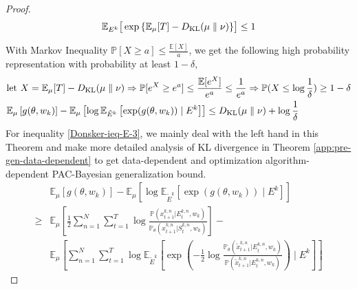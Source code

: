 \begin{proof}
	\begin{equation}
		\label{Donsker-ieq-E-2}
		\mathbb{E}_{E^{k}}\big[\operatorname{exp}{\{\mathbb{E}_{\mu}[T]-D_{\mathrm{KL}}(\mu\parallel \nu)\}}\big] \leq 1
	\end{equation}
	
	With Markov Inequality $\mathbb{P}[X \geq a]\leq \frac{\mathbb{E}[X]}{a}$, we get the following high probability representation with probability at least $1-\delta$,
	\begin{align}
		&\text{let}\ X=\mathbb{E}_{\mu}[T]-D_{\mathrm{KL}}(\mu\parallel \nu) \Rightarrow \mathbb{P}[e^X \geq e^a]\leq \frac{\mathbb{E}[e^X]}{e^a} \leq \frac{1}{e^a} \Rightarrow \mathbb{P}(X \leq \operatorname{log}\frac{1}{\delta}) \geq 1-\delta\nonumber\\
		&\mathbb{E}_{\mu}\left[g(\theta,w_k)\right]-\mathbb{E}_{\mu}\left[\log \mathbb{E}_{\tilde{E}^k}\left[\exp(g(\theta,w_k))\mid E^k\right]\right] \leq D_{\mathrm{KL}}(\mu\parallel \nu) +\operatorname{log}\frac{1}{\delta} \label{Donsker-ieq-E-3} 
	\end{align}
	For inequality \ref{Donsker-ieq-E-3}, we mainly deal with the left hand in this Theorem and make more detailed analysis of KL divergence in Theorem \ref{app:pre-gen-data-dependent} to get data-dependent and optimization algorithm-dependent PAC-Bayesian generalization bound.
    \begin{align}
		&\mathbb{E}_{\mu}\left[g(\theta,w_k)\right]-\mathbb{E}_{\mu}\left[\log \mathbb{E}_{\tilde{E}^k}\left[\exp(g(\theta,w_k))\mid E^k\right]\right] \nonumber
		\\
        \geq& \mathbb{E}_{\mu}\left[\frac{1}{2}\sum_{n=1}^{N}\sum_{t=1}^T\operatorname{log}\frac{\mathbb{P}(x^{k,n}_{t+1}|E^{k,n}_t,w_k)}{\mathbb{P}_{\theta}(x^{k,n}_{t+1}|S^{k,n}_t,w_k)}\right]- \nonumber \\
        &\mathbb{E}_{\mu}\left[\sum_{n=1}^{N}\sum_{t=1}^T\operatorname{log}\mathbb{E}_{\tilde{E}^k}\left[\operatorname{exp}\left(-\frac{1}{2}\operatorname{log}\frac{\mathbb{P}_{\theta}(\tilde{x}^{k,n}_{t+1}|E^{k,n}_t,w_k)}{\mathbb{P}(\tilde{x}^{k,n}_{t+1}|E^{k,n}_t,w_k)}\right)\mid E^k\right]\right]
	\end{align}


\end{proof}
